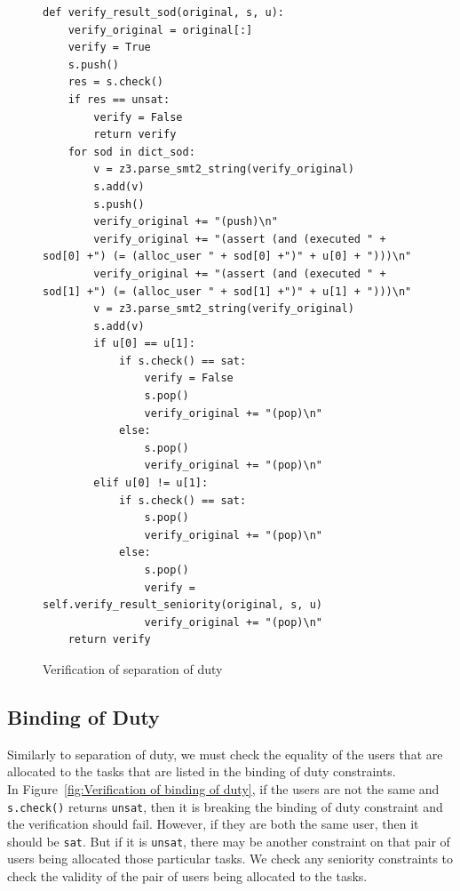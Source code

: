 \documentclass[a4paper]{report}
\begin{document}
\begin{figure}[H]
\lstset{numbers=left, showspaces=false,
    showstringspaces=false, tabsize=2, breaklines=true,
    xleftmargin=5.0ex,
}
\begin{lstlisting}[frame=single]
def verify_result_sod(original, s, u):
	verify_original = original[:]
	verify = True
	s.push()
	res = s.check()
	if res == unsat:
		verify = False
		return verify
	for sod in dict_sod:
		v = z3.parse_smt2_string(verify_original)
		s.add(v)
		s.push()
		verify_original += "(push)\n"
		verify_original += "(assert (and (executed " + sod[0] +") (= (alloc_user " + sod[0] +")" + u[0] + ")))\n"
		verify_original += "(assert (and (executed " + sod[1] +") (= (alloc_user " + sod[1] +")" + u[1] + ")))\n"
		v = z3.parse_smt2_string(verify_original)
		s.add(v)
		if u[0] == u[1]:
			if s.check() == sat:
				verify = False
				s.pop()
				verify_original += "(pop)\n"
			else:
				s.pop()
				verify_original += "(pop)\n"
		elif u[0] != u[1]:
			if s.check() == sat:
				s.pop()
				verify_original += "(pop)\n"
			else:
				s.pop()
				verify = self.verify_result_seniority(original, s, u)
				verify_original += "(pop)\n"
	return verify
\end{lstlisting}
\caption{Verification of separation of duty}
\label{Verification of separation of duty}
\end{figure}

\newpage

\subsection{Binding of Duty}
Similarly to separation of duty, we must check the equality of the users that are allocated to the tasks that are listed in the binding of duty constraints.\\ 

In Figure~\ref{fig:Verification of binding of duty}, if the users are not the same and \texttt{s.check()} returns \texttt{unsat}, then it is breaking the binding of duty constraint and the verification should fail. However, if they are both the same user, then it should be \texttt{sat}. But if it is \texttt{unsat}, there may be another constraint on that pair of users being allocated those particular tasks. We check any seniority constraints to check the validity of the pair of users being allocated to the tasks.\\
\end{document}
